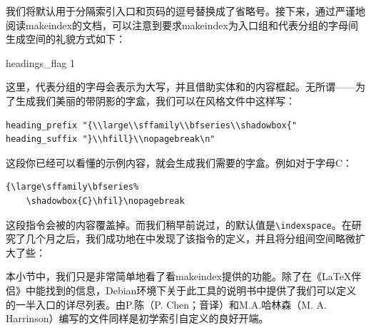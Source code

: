 我们将默认用于分隔索引入口和页码的逗号替换成了省略号。接下来，通过严谨地阅读\textsf{makeindex}的文档，可以注意到要求\textsf{makeindex}为入口组和代表分组的字母间生成空间的礼貌方式如下：

\begin{dmd}
headings\_flag 1
\end{dmd}

这里，代表分组的字母会表示为大写，并且借助实体和的内容框起。无所谓——为了生成我们美丽的带阴影的字盒，我们可以在风格文件中这样写：

\begin{dmd}
\begin{verbatim}
heading_prefix "{\\large\\sffamily\\bfseries\\shadowbox{"
heading_suffix "}\\hfill}\\nopagebreak\n"
\end{verbatim}
\end{dmd}

这段你已经可以看懂的示例内容，就会生成我们需要的字盒。例如对于字母C：

\begin{codelist}[10.1]{
    {\large\sffamily\bfseries%
    \hfil}\nopagebreak
}\begin{verbatim}
{\large\sffamily\bfseries%
    \shadowbox{C}\hfil}\nopagebreak
\end{verbatim}
\end{codelist}

这段指令会被的内容覆盖掉。而我们稍早前说过，的默认值是\verb|\indexspace|。在研究了几个月之后，我们成功地在中发现了该指令的定义，并且将分组间空间略微扩大了些：

\begin{dmd}
\renewcommand\indexspace{%
    \par \vskip 20pt plus5pt minus3pt\relax}
\end{dmd}

\begin{ii}
本小节中，我们只是非常简单地看了看makeindex提供的功能。除了在《\LaTeX 伴侣》中能找到的信息，Debian环境下关于此工具的说明书中提供了我们可以定义的一半入口的详尽列表。由P.陈（P. Chen；音译）和M.A.哈林森（M. A. Harrinson）编写的文件同样是初学索引自定义的良好开端。
\end{ii}


